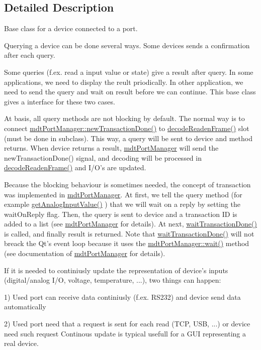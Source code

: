 \subsection{Detailed Description}
Base class for a device connected to a port. 

Querying a device can be done several ways. Some devices sends a confirmation after each query.

Some queries (f.\-ex. read a input value or state) give a result after query. In some applications, we need to display the reult priodically. In other application, we need to send the query and wait on result before we can continue. This base class gives a interface for these two cases.

At basis, all query methods are not blocking by default. The normal way is to connect \hyperlink{classmdt_port_manager_a416a24db1048e9f66aef27ea810954d2}{mdt\-Port\-Manager\-::new\-Transaction\-Done()} to \hyperlink{classmdt_device_ad211ba3be781c3db0397d5bf91f796d1}{decode\-Readen\-Frame()} slot (must be done in subclass). This way, a query will be sent to device and method returns. When device returns a result, \hyperlink{classmdt_port_manager}{mdt\-Port\-Manager} will send the new\-Transaction\-Done() signal, and decoding will be processed in \hyperlink{classmdt_device_ad211ba3be781c3db0397d5bf91f796d1}{decode\-Readen\-Frame()} and I/\-O's are updated.

Because the blocking behaviour is sometimes needed, the concept of transaction was implemented in \hyperlink{classmdt_port_manager}{mdt\-Port\-Manager}. At first, we tell the query method (for example \hyperlink{classmdt_device_ab828764660ba53ffce1995901ddf5a0a}{get\-Analog\-Input\-Value()} ) that we will wait on a reply by setting the wait\-On\-Reply flag. Then, the query is sent to device and a transaction I\-D is added to a list (see \hyperlink{classmdt_port_manager}{mdt\-Port\-Manager} for details). At next, \hyperlink{classmdt_device_ab937015c1a319b7234442a4cc29a02a8}{wait\-Transaction\-Done()} is called, and finally result is returned. Note that \hyperlink{classmdt_device_ab937015c1a319b7234442a4cc29a02a8}{wait\-Transaction\-Done()} will not breack the Qt's event loop because it uses the \hyperlink{classmdt_port_manager_aaa85e0200aba0e0f4392dfe01abae2cf}{mdt\-Port\-Manager\-::wait()} method (see documentation of \hyperlink{classmdt_port_manager}{mdt\-Port\-Manager} for details).

If it is needed to continiusly update the representation of device's inputs (digital/analog I/\-O, voltage, temperature, ...), two things can happen\-:
\begin{DoxyItemize}
\item 1) Used port can receive data continiusly (f.\-ex. R\-S232) and device send data automatically
\item 2) Used port need that a request is sent for each read (T\-C\-P, U\-S\-B, ...) or device need such request Continous update is typical usefull for a G\-U\-I representing a real device.
\end{DoxyItemize}

